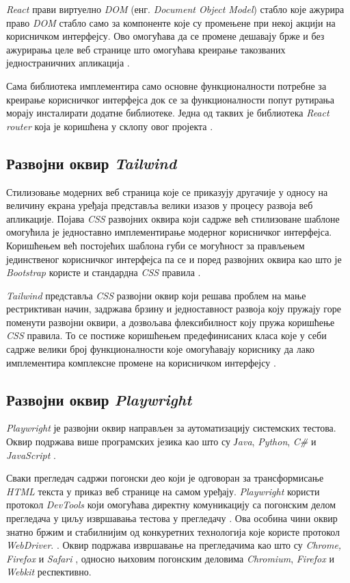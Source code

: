\documentclass[12pt,oneside]{memoir}
\begin{document}
\textit{React} прави виртуелно \textit{DOM} (енг. \textit{Document Object Model}) стабло које ажурира право \textit{DOM} стабло само за компоненте које су промењене при некој акцији на корисничком интерфејсу. Ово омогућава да се промене дешавају брже и без ажурирања целе веб странице што омогућава креирање такозваних једностраничних апликација \cite{react}. 

Сама библиотека имплементира само основне функционалности потребне за креирање корисничког интерфејса док се за функционалности попут рутирања морају инсталирати додатне библиотеке. Једна од таквих је библиотека \textit{React router} која је коришћена у склопу овог пројекта \cite{reactRouter}.

\subsection{Развојни оквир \textit{Tailwind} }

Стилизовање модерних веб страница које се приказују другачије у односу на величину екрана уређаја представља велики изазов у процесу развоја веб апликације. Појава \textit{CSS} развојних оквира који садрже већ стилизоване шаблоне омогућила је једноставно имплементирање модерног корисничког интерфејса. Коришћењем већ постојећих шаблона губи се могућност за прављењем јединственог корисничког интерфејса па се и поред развојних оквира као што је \textit{Bootstrap} користе и стандардна \textit{CSS} правила \cite{bootstrap}.

\textit{Tailwind} представља \textit{CSS} развојни оквир који решава проблем на мање рестриктиван начин, задржава брзину и једноставност развоја коју пружају горе поменути развојни оквири, а дозвољава флексибилност коју пружа коришћење \textit{CSS} правила. То се постиже коришћењем предефинисаних класа које у себи садрже велики број функционалности које омогућавају кориснику да лако имплементира комплексне промене на корисничком интерфејсу \cite{tailwind}.


\subsection{Развојни оквир \textit{Playwright}}

\textit{Playwright} је развојни оквир направљен за аутоматизацију системских тестова. Оквир подржава више програмских језика као што су \textit{Јava}, \textit{Python}, \textit{C\#}  и \textit{JavaScript} \cite{playwright}.

Сваки прегледач садржи погонски део који је одговоран за трансформисање \textit{HTML} текста у приказ веб странице на самом уређају. \textit{Playwright} користи протокол \textit{DevTools} који омогућава директну комуникацију са погонским делом прегледача у циљу извршавања тестова у прегледачу \cite{playwrightTutorial}. Ова особина чини оквир знатно бржим и стабилнијим од конкуретних технологија које користе протокол \textit{WebDriver}. \cite{playwrightVsSelenium,speedTest}. Оквир подржава извршавање на прегледачима као што су \textit{Chrome,  Firefox} и \textit{Safari} , односно њиховим погонским деловима \textit{Chromium}, \textit{Firefox} и \textit{Webkit} респективно\cite{playwright, chromium,webKit}.
\end{document}
